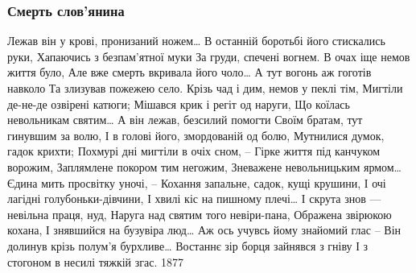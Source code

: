  
 
 

\subsubsection{Смерть слов’янина}
\label{sec:poetry.rus.mihailo_staryckii.smert_slovjanyna}

Лежав він у крові, пронизаний ножем…
В останній боротьбі його стискались руки,
Хапаючись з безпам’ятної муки
За груди, спечені вогнем.
В очах іще немов життя було,
Але вже смерть вкривала його чоло…
А тут вогонь аж гоготів навколо
Та злизував пожежею село.
Крізь чад і дим, немов у пеклі тім,
Мигтіли де-не-де озвірені катюги;
Мішався крик і регіт од наруги,
Що коїлась невольникам святим…
А він лежав, безсилий помогти
Своїм братам, тут гинувшим за волю,
І в голові його, змордованій од болю,
Мутнилися думок, гадок крихти;
Похмурі дні мигтіли в очіх сном, –
Гірке життя під канчуком ворожим,
Заплямлене покором тим негожим,
Зневажене невольницьким ярмом…
Єдина мить просвітку уночі, –
Кохання запальне, садок, кущі крушини,
І очі лагідні голубоньки-дівчини,
І хвилі кіс на пишному плечі…
І скрута знов --- невільна праця, нуд,
Наруга над святим того невіри-пана,
Ображена звірюкою кохана,
І знявшийся на бузувіра люд…
Аж ось учувсь йому знайомий глас –
Він долинув крізь полум’я бурхливе…
Востаннє зір борця зайнявся з гніву
І з стогоном в несилі тяжкій згас.
1877 
